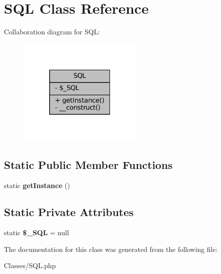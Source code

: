 \hypertarget{classSQL}{}\section{S\+QL Class Reference}
\label{classSQL}


Collaboration diagram for S\+QL\+:\nopagebreak
\begin{figure}[H]
\begin{center}
\leavevmode
\includegraphics[width=172pt]{classSQL__coll__graph}
\end{center}
\end{figure}
\subsection*{Static Public Member Functions}
\begin{DoxyCompactItemize}
\item 
\mbox{\label{classSQL_a7704a7213939ea2120ca2abee226d08e}} 
static {\bfseries get\+Instance} ()
\end{DoxyCompactItemize}
\subsection*{Static Private Attributes}
\begin{DoxyCompactItemize}
\item 
\mbox{\label{classSQL_aa96548c10c0df9772168e13dd60ec4cf}} 
static {\bfseries \$\+\_\+\+S\+QL} = null
\end{DoxyCompactItemize}


The documentation for this class was generated from the following file\+:\begin{DoxyCompactItemize}
\item 
Classes/S\+Q\+L.\+php\end{DoxyCompactItemize}
